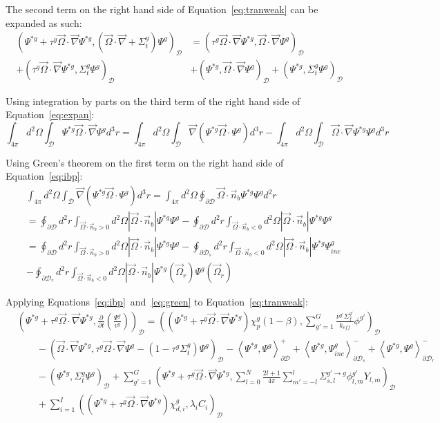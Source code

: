 \documentclass[11pt]{tamurmemo}
\newcommand{\grad}{\vec{\nabla}}
\newcommand{\be}{\begin{equation}}
\newcommand{\ee}{\end{equation}}
\newcommand{\kef}{\ensuremath{k_{\textit{eff}}}}
\newcommand{\keff}{\kef\xspace}
\newcommand{\vo}{\vec{\Omega}}
\newcommand{\vn}{\vec{n}}
\newcommand{\qq}{\quad\quad}
\newcommand{\D}{\ensuremath{\mathcal{D}}}
\begin{document}
The second term on the right hand side of Equation~\ref{eq:tranweak} can be expanded as such:
\begin{align}
\left(\Psi^{*g}+\tau^g\vo\cdot\grad \Psi^{*g}, \left(\vo\cdot\grad + \Sigma_t^g\right) \Psi^g\right)_\D &= \left(\tau^g\vo\cdot\grad \Psi^{*g}, \vo\cdot\grad \Psi^g\right)_\D  \nonumber \\
 + \left(\tau^g\vo\cdot\grad \Psi^{*g}, \Sigma_t^g \Psi^g\right)_\D &+ \left(\Psi^{*g}, \vo\cdot\grad \Psi^g\right)_\D + \left(\Psi^{*g}, \Sigma_t^g\Psi^g\right)_\D
\label{eq:expan}
\end{align}

Using integration by parts on the third term of the right hand side of Equation~\ref{eq:expan}:
\be
\int_{4\pi}d^2\Omega\int_\D\Psi^{*g} \vo\cdot\grad \Psi^g d^3r = \int_{4\pi}d^2\Omega\int_\D\grad(\Psi^{*g}\vo\cdot\Psi^g)d^3r - \int_{4\pi}d^2\Omega\int_\D \vo\cdot\grad \Psi^{*g}\Psi^g d^3r
\label{eq:ibp}
\ee

Using Green's theorem on the first term on the right hand side of Equation~\ref{eq:ibp}:
\begin{align}
&\int_{4\pi}d^2\Omega\int_\D\grad(\Psi^{*g}\vo\cdot\Psi^g)d^3r = \int_{4\pi}d^2\Omega\oint_{\partial \D} \vo\cdot\vn_b\Psi^{*g}\Psi^g d^2r \\
&= \oint_{\partial \D}d^2r\int_{\vo\cdot\vn_b>0}d^2\Omega \left|\vo\cdot\vn_b\right| \Psi^{*g}\Psi^g - \oint_{\partial \D}d^2r\int_{\vo\cdot\vn_b<0}d^2\Omega \left|\vo\cdot\vn_b\right| \Psi^{*g}\Psi^g \\
&= \oint_{\partial \D}d^2r\int_{\vo\cdot\vn_b>0}d^2\Omega \left|\vo\cdot\vn_b\right| \Psi^{*g}\Psi^g - \oint_{\partial \D_s}d^2r\int_{\vo\cdot\vn_b <0}d^2\Omega\left|\vo\cdot\vn_b\right| \Psi^{*g}\Psi^g_{inc} \nonumber \\
& - \oint_{\partial \D_r}d^2r\int_{\vo\cdot\vn_b <0}d^2\Omega\left|\vo\cdot\vn_b\right| \Psi^{*g}(\vo_r)\Psi^g(\vo_r)
\label{eq:green}
\end{align}

Applying Equations~\ref{eq:ibp}~and~\ref{eq:green} to Equation~\ref{eq:tranweak}:
\begin{align}
&\left(\Psi^{*g}+\tau^g\vo\cdot\grad\Psi^{*g},\frac{\partial}{\partial t}\left(\frac{\Psi^g}{v^g}\right)\right)_\D = \left(\left(\Psi^{*g}+\tau^g\vo\cdot\grad\Psi^{*g}\right)\chi_p^g(1-\beta),\sum_{g'=1}^G \frac{\nu^{g'} \Sigma_f^{g'}}{\keff} \phi^{g'}\right)_\D \nonumber \\
& \qq - \left(\vo\cdot\grad\Psi^{*g}, \tau^g\vo\cdot\grad\Psi^g - (1 - \tau^g\Sigma_t^g)\Psi^g\right)_\D - \left\langle\Psi^{*g},\Psi^{g}\right\rangle_{\partial \D}^+ + \left\langle\Psi^{*g},\Psi^{g}_{inc}\right\rangle_{\partial \D_s}^- + \left\langle\Psi^{*g},\Psi^{g}\right\rangle_{\partial \D_r}^- \nonumber \\
& \qq - \left(\Psi^{*g},\Sigma_t^g\Psi^g\right)_\D + \sum_{g'=1}^G\left(\Psi^{*g}+\tau^g\vo\cdot\grad\Psi^{*g},\sum_{l=0}^N \frac{2l+1}{4\pi}\sum_{m'=-l}^l\Sigma_{s,l}^{g'\to g} \phi^{g'}_{l,m}Y_{l,m}\right)_\D \nonumber \\
& \qq + \sum_{i=1}^I \left(\left(\Psi^{*g}+\tau^g\vo\cdot\grad\Psi^{*g}\right)\chi_{d,i}^g,\lambda_i C_i\right)_\D
\label{eq:diffweak}
\end{align}
\end{document}
